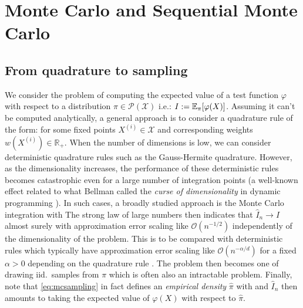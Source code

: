 
\section{Monte Carlo and Sequential Monte Carlo}
\subsection{From quadrature to sampling}
We consider the problem of computing the expected value of a test function $\varphi$ with respect to a distribution $\pi\in\mathcal P(\mathcal X)$ i.e.: $I:=\mathbb E_\pi[\varphi(X)]$. Assuming it can't be computed analytically, a general approach is to consider a quadrature rule of the form:
%
%
for some fixed points $X^{(i)}\in\mathcal X$ and corresponding weights $w(X^{(i)})\in\mathbb R_+$. 
When the number of dimensions is low, we can consider deterministic quadrature rules such as the Gauss-Hermite quadrature.\addref 
However, as the dimensionality increases, the performance of these deterministic rules becomes catastrophic even for a large number of integration points (a well-known effect related to what Bellman called the \emph{curse of dimensionality} in dynamic programming \citep{bellman57}). 
In such cases, a broadly studied approach is the Monte Carlo integration with
%
%
The strong law of large numbers then indicates that $\widehat I_n\to I$ almost surely with approximation error scaling like $\mathcal O(n^{-1/2})$ independently of the dimensionality of the problem. This is to be compared with deterministic rules which typically have approximation error scaling like $\mathcal O(n^{-\alpha/d})$ for a fixed $\alpha>0$ depending on the quadrature rule \citep{caflisch98}. The problem then becomes one of drawing iid.\ samples from $\pi$ which is often also an intractable problem. Finally, note that \eqref{eq:mcsampling} in fact defines an \emph{empirical density} $\hat \pi$ with
%
%
and $\hat I_{n}$ then amounts to taking the expected value of $\varphi(X)$ with respect to $\hat\pi$.

